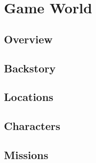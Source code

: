 \chapter{Game World}\label{ch:game-world}

\section{Overview}
\section{Backstory}
\section{Locations}
\section{Characters}
\section{Missions}
